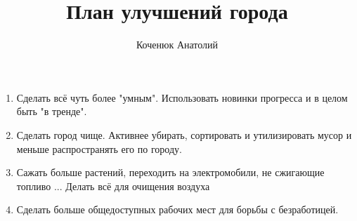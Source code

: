 \documentclass[12pt,a4paper]{article}
\author{Коченюк Анатолий}
\title{План улучшений города}
\begin{document}
 	\maketitle
 \begin{enumerate}
 	\item Сделать всё чуть более "умным". Использовать новинки прогресса и в целом быть "в тренде".
 	\item Сделать город чище. Активнее убирать, сортировать и утилизировать мусор и меньше распространять его по городу.
 	\item Сажать больше растений, переходить на электромобили, не сжигающие топливо ... Делать всё для очищения воздуха
 	\item Сделать больше общедоступных рабочих мест для борьбы с безработицей. 
 	
 \end{enumerate}
 
\end{document}
